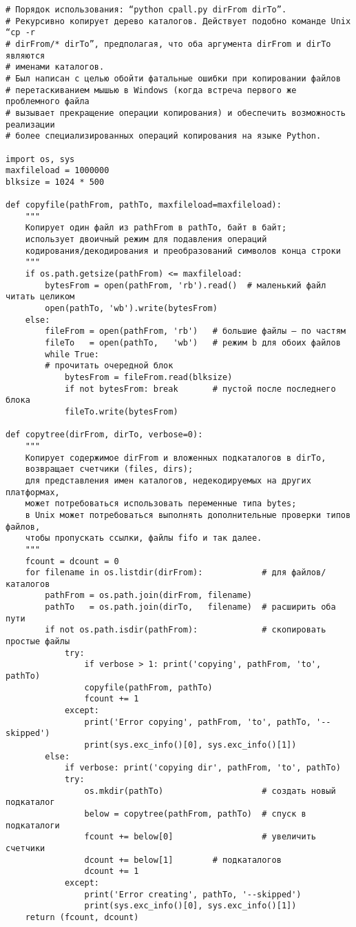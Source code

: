\documentclass[12pt]{article}
\begin{document}
\begin{verbatim}
# Порядок использования: “python cpall.py dirFrom dirTo”.
# Рекурсивно копирует дерево каталогов. Действует подобно команде Unix “cp -r
# dirFrom/* dirTo”, предполагая, что оба аргумента dirFrom и dirTo являются
# именами каталогов.
# Был написан с целью обойти фатальные ошибки при копировании файлов
# перетаскиванием мышью в Windows (когда встреча первого же проблемного файла
# вызывает прекращение операции копирования) и обеспечить возможность реализации
# более специализированных операций копирования на языке Python.

import os, sys
maxfileload = 1000000
blksize = 1024 * 500

def copyfile(pathFrom, pathTo, maxfileload=maxfileload):
    """
    Копирует один файл из pathFrom в pathTo, байт в байт;
	использует двоичный режим для подавления операций
	кодирования/декодирования и преобразований символов конца строки
    """
    if os.path.getsize(pathFrom) <= maxfileload:
        bytesFrom = open(pathFrom, 'rb').read()  # маленький файл читать целиком
        open(pathTo, 'wb').write(bytesFrom)
    else:
        fileFrom = open(pathFrom, 'rb')   # большие файлы – по частям
        fileTo   = open(pathTo,   'wb')   # режим b для обоих файлов
        while True:
        # прочитать очередной блок
            bytesFrom = fileFrom.read(blksize)    
            if not bytesFrom: break       # пустой после последнего блока
            fileTo.write(bytesFrom)

def copytree(dirFrom, dirTo, verbose=0):
    """
    Копирует содержимое dirFrom и вложенных подкаталогов в dirTo,
	возвращает счетчики (files, dirs);
	для представления имен каталогов, недекодируемых на других платформах,
	может потребоваться использовать переменные типа bytes;
	в Unix может потребоваться выполнять дополнительные проверки типов файлов,
	чтобы пропускать ссылки, файлы fifo и так далее.
    """
    fcount = dcount = 0
    for filename in os.listdir(dirFrom):            # для файлов/каталогов
        pathFrom = os.path.join(dirFrom, filename)
        pathTo   = os.path.join(dirTo,   filename)  # расширить оба пути
        if not os.path.isdir(pathFrom):             # скопировать простые файлы
            try:
                if verbose > 1: print('copying', pathFrom, 'to', pathTo)
                copyfile(pathFrom, pathTo)
                fcount += 1
            except:
                print('Error copying', pathFrom, 'to', pathTo, '--skipped')
                print(sys.exc_info()[0], sys.exc_info()[1])
        else:
            if verbose: print('copying dir', pathFrom, 'to', pathTo)
            try:
                os.mkdir(pathTo)                    # создать новый подкаталог
                below = copytree(pathFrom, pathTo)  # спуск в подкаталоги
                fcount += below[0]                  # увеличить счетчики
                dcount += below[1]		  # подкаталогов
                dcount += 1
            except:
                print('Error creating', pathTo, '--skipped')
                print(sys.exc_info()[0], sys.exc_info()[1])
    return (fcount, dcount)


\end{verbatim}
\end{document}
